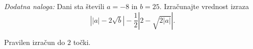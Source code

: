 \documentclass[addpoints]{exam}
\begin{document}
\begin{questions}









      

    \bonusquestion[3]
    \textit{Dodatna naloga:} Dani sta števili $a=-8$ in $b=25$.
        Izračunajte vrednost izraza $$\left||a|-2\sqrt{b}\right|-\frac{1}{2}\left|2-\sqrt{2|a|}\right|.$$

    \begin{solution}[5cm]
        Pravilen izračun do $2$ točki.
    \end{solution}




\end{questions}
\end{document}
